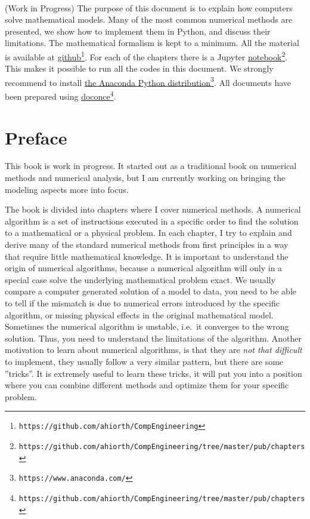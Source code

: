 \documentclass[graybox,sectrefs,envcountresetchap,open=right,final]{svmonodo}
\begin{document}
\ \\ [13mm]
\begin{center}
\begin{minipage}{0.9\linewidth}
\small
(Work in Progress) The purpose of this document is to explain how computers solve mathematical models.
Many of the most common numerical methods are presented, we show how to implement them in Python, and discuss their limitations.
The mathematical formalism is kept to a minimum. All the material is available at
\href{{https://github.com/ahiorth/CompEngineering}}{github}\footnote{\texttt{https://github.com/ahiorth/CompEngineering}}. For each of the chapters there is a Jupyter \href{{https://github.com/ahiorth/CompEngineering/tree/master/pub/chapters}}{notebook}\footnote{\texttt{https://github.com/ahiorth/CompEngineering/tree/master/pub/chapters}}. This makes it possible to run all the codes in this document.
We strongly recommend to install \href{{https://www.anaconda.com/}}{the Anaconda Python distribution}\footnote{\texttt{https://www.anaconda.com/}}. All documents have been prepared using \href{{https://github.com/ahiorth/CompEngineering/tree/master/pub/chapters}}{doconce}\footnote{\texttt{https://github.com/ahiorth/CompEngineering/tree/master/pub/chapters}}.

\end{minipage}
\end{center}

\chapter*{Preface}
\label{ch:preface}
This book is  work in progress. It started out as a traditional book on numerical methods and numerical analysis, but I am currently working on bringing the modeling aspects more into focus.

The book is divided into chapters where I cover numerical methods. A numerical algorithm is a set of instructions executed in a specific order to find the solution to a mathematical or a physical problem. In each chapter, I try to explain and derive many of the standard numerical methods from first principles in a way that require little mathematical knowledge. It is important to understand the origin of numerical algorithms, because a numerical algorithm will only in a special case solve the underlying mathematical problem exact. We usually compare a computer generated solution of a model to data, you need to be able to tell if the mismatch is due to numerical errors introduced by the specific algorithm, or missing physical effects in the original mathematical model. Sometimes the numerical algorithm is unstable, i.e.~it converges to the wrong solution. Thus, you need to understand the limitations of the algorithm. Another motivation to learn about numerical algorithms, is that they are \emph{not that difficult} to implement, they usually follow a very similar pattern, but there are some ''tricks''. It is extremely useful to learn these tricks, it will put you into a position where you can combine different methods and optimize them for your specific problem.
\end{document}

